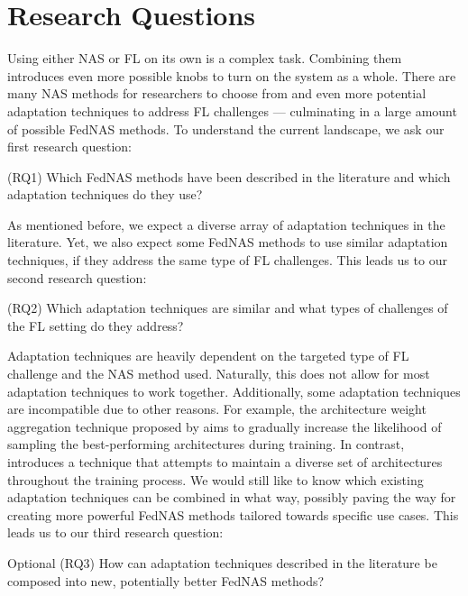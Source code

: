 \section{Research Questions}

Using either NAS or FL on its own is a complex task. Combining them introduces even more possible knobs to turn on the system as a whole. There are many NAS methods for researchers to choose from and even more potential adaptation techniques to address FL challenges — culminating in a large amount of possible FedNAS methods. To understand the current landscape, we ask our first research question:

\vspace{1em}
(RQ1) Which FedNAS methods have been described in the literature and which adaptation techniques do they use?
\vspace{1em}

As mentioned before, we expect a diverse array of adaptation techniques in the literature. Yet, we also expect some FedNAS methods to use similar adaptation techniques, if they address the same type of FL challenges. This leads us to our second research question:

\vspace{1em}
(RQ2) Which adaptation techniques are similar and what types of challenges of the FL setting do they address?
\vspace{1em}

Adaptation techniques are heavily dependent on the targeted type of FL challenge and the NAS method used. Naturally, this does not allow for most adaptation techniques to work together. Additionally, some adaptation techniques are incompatible due to other reasons. For example, the architecture weight aggregation technique proposed by \cite{efnas_2024} aims to gradually increase the likelihood of sampling the best-performing architectures during training. In contrast, \cite{superfednas_2024} introduces a technique that attempts to maintain a diverse set of architectures throughout the training process. We would still like to know which existing adaptation techniques can be combined in what way, possibly paving the way for creating more powerful FedNAS methods tailored towards specific use cases. This leads us to our third research question:

\vspace{1em}
Optional (RQ3) How can adaptation techniques described in the literature be composed into new, potentially better FedNAS methods?
\vspace{1em}

